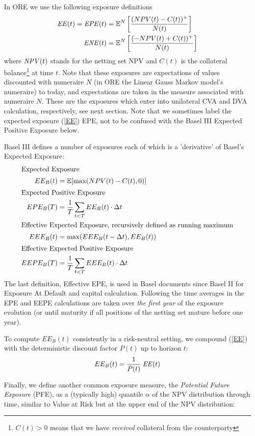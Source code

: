 In ORE we use the following exposure definitions
\begin{align}
\mathit{EE}(t) = \mathit{EPE}(t) &= \operatorname{\mathbb{E}}^N\left[ \frac{(NPV(t)-C(t))^+}{N(t)} \right] \label{EE}\\
\mathit{ENE}(t) &= \operatorname{\mathbb{E}}^N\left[ \frac{(-NPV(t)+C(t))^+}{N(t)} \right] \label{ENE}
\end{align}
where $\mathit{NPV}(t)$ stands for the netting set NPV and $C(t)$ is the collateral balance\footnote{$C(t)>0$ means that we have
  {\em received} collateral from the counterparty} at time $t$. Note that these exposures are expectations of values
discounted with numeraire $N$ (in ORE the Linear Gauss Markov model's numeraire) to today, and expectations are taken in
the measure associated with numeraire $N$. These are the exposures which enter into unilateral CVA and DVA calculation,
respectively, see next section. Note that we sometimes label the expected exposure (\ref{EE}) EPE, not to be confused
with the Basel III Expected Positive Exposure below.

\medskip
Basel III defines a number of exposures each of which is a 'derivative' of Basel's Expected Exposure:
\begin{align}
\intertext{Expected Exposure}
EE_B(t) &= \operatorname{\mathbb{E}}[\max(NPV(t) - C(t), 0)] \label{basel_ee}\\
\intertext{Expected Positive Exposure}
EPE_B(T) &= \frac{1}{T} \sum_{t<T} EE_B(t)\cdot \Delta t  \label{basel_epe} \\
\intertext{Effective Expected Exposure, recursively defined as running maximum}
EEE_B(t) &= \max(EEE_B(t-\Delta t), EE_B(t)) \label{basel_eee}\\
\intertext{Effective Expected Positive Exposure}
EEPE_B(T) &= \frac{1}{T} \sum_{t<T} EEE_B(t)\cdot \Delta t \label{basel_eepe}
\end{align}
The last definition, Effective EPE, is used in Basel documents since Basel II for Exposure At Default and capital
calculation. Following \cite{bcbs128,bcbs189} the time averages in the EPE and EEPE calculations are taken over {\em the
  first year} of the exposure evolution (or until maturity if all positions of the netting set mature before one year).

\medskip
To compute $EE_B(t)$ consistently in a risk-neutral setting, we compound (\ref{EE}) with the deterministic discount factor $P(t)$ up to horizon $t$:
$$
EE_B(t) = \frac{1}{P(t)} \:\mathit{EE}(t)
$$

Finally, we define another common exposure measure, the {\em Potential Future Exposure} (PFE), as a (typically high)
quantile $\alpha$ of the NPV distribution through time, similar to Value at Risk but at the upper end of the NPV
distribution:

